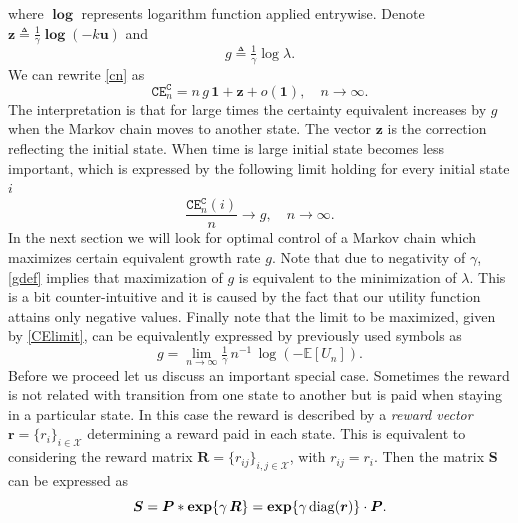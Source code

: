 where $\bm{\log}$ represents logarithm function applied entrywise. Denote $\bm{z}\triangleq\tfrac{1}{\gamma}\bm{\log}(-k\bm{u})$ and 
\begin{equation}
\label{gdef}
g\triangleq\tfrac{1}{\gamma}\log\lambda.
\end{equation}
We can rewrite \eqref{cn} as
\begin{equation}
\bm{\texttt{CE}}^{\texttt{C}}_n = n\,g\,\bm{1} + \bm{z} +o(\bm{1}), \quad n\rightarrow \infty.
\end{equation}
The interpretation is that for large times the certainty equivalent increases by $g$ when the Markov chain moves to another state. The vector $\bm{z}$ is the correction reflecting the initial state. When time is large initial state becomes less important, which is expressed by the following limit holding for every initial state $i$
\begin{equation}
\label{CElimit}
\frac{\bm{\texttt{CE}}^{\texttt{C}}_{n}(i)}{n}\rightarrow g, \quad n\rightarrow\infty.
\end{equation}
In the next section we will look for optimal control of a Markov chain which maximizes certain equivalent growth rate $g$. Note that due to negativity of $\gamma$, \eqref{gdef} implies that maximization of $g$ is equivalent to the minimization of $\lambda$. This is a bit counter-intuitive and it is caused by the fact that our utility function attains only negative values. 
Finally note that the limit to be maximized, given by \eqref{CElimit}, can be equivalently expressed by previously used symbols as
\begin{equation}
\label{CritCh1}
g=\lim_{n\rightarrow\infty}\tfrac{1}{\gamma}\,n^{-1}\,\log(-\mathbb{E}[U_n]).
\end{equation}
Before we proceed let us discuss an important special case. Sometimes the reward is not related with transition from one state to another but is paid when staying in a particular state. In this case the reward is described by a {\em reward vector} $\bm{r}=\{r_i\}_{i\in\mathcal{X}}$ determining a reward paid in each state. This is equivalent to considering the reward matrix $\bm{R}=\{r_{ij}\}_{i,j\in\mathcal{X}}$, with $r_{ij}=r_{i}$. Then the matrix $\bm{S}$ can be expressed as 
\begin{equation}
\label{QmformSpec}
\mbox{\boldmath{$S$}}=\mbox{\boldmath{$P$}}\ast\mbox{\boldmath{$\exp$}}\{\gamma\,\mbox{\boldmath{$R$}}\}=\mbox{\boldmath{$\exp$}}\{\gamma\,{\mathrm{diag}}(\mbox{\boldmath{$r$}})\}\cdot\mbox{\boldmath{$P$}}.
\end{equation}
\vspace{4 mm}
\newpage
